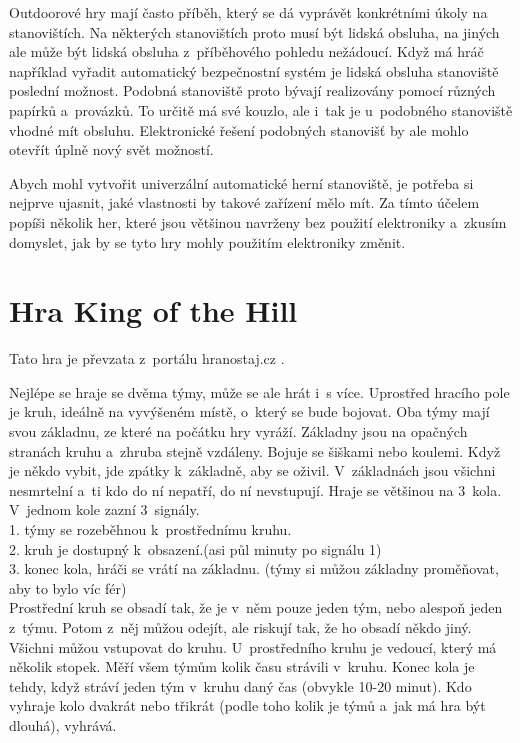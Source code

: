 Outdoorové hry mají často příběh, který se dá vyprávět konkrétními úkoly na stanovištích.
Na některých stanovištích proto musí být lidská obsluha, na jiných ale může být lidská obsluha z~příběhového pohledu nežádoucí.
Když má hráč například vyřadit automatický bezpečnostní systém je lidská obsluha stanoviště poslední možnost.
Podobná stanoviště proto bývají realizovány pomocí různých papírků a~provázků.
To určitě má své kouzlo, ale i~tak je u~podobného stanoviště vhodné mít obsluhu.
Elektronické řešení podobných stanovišť by ale mohlo otevřít úplně nový svět možností.

Abych mohl vytvořit univerzální automatické herní stanoviště, je potřeba si nejprve ujasnit, jaké vlastnosti by takové zařízení mělo mít.
Za tímto účelem popíši několik her, které jsou většinou navrženy bez použití elektroniky a~zkusím domyslet, jak by se tyto hry mohly použitím elektroniky změnit.

\section{Hra King of the Hill \label{KOTH} }
Tato hra je převzata z~portálu hranostaj.cz \cite{KingOfTheHill}.

Nejlépe se hraje se dvěma týmy, může se ale hrát i~s více. 
Uprostřed hracího pole je kruh, ideálně na vyvýšeném místě, o~který se bude bojovat. 
Oba týmy mají svou základnu, ze které na počátku hry vyráží.
Základny jsou na opačných stranách kruhu a~zhruba stejně vzdáleny.
Bojuje se šiškami nebo koulemi. 
Když je někdo vybit, jde zpátky k~základně, aby se oživil. 
V~základnách jsou všichni nesmrtelní a~ti kdo do ní nepatří, do ní nevstupují.
Hraje se většinou na 3~kola. 
V~jednom kole zazní 3~signály.\\
1. týmy se rozeběhnou k~prostřednímu kruhu.\\
2. kruh je dostupný k~obsazení.(asi půl minuty po signálu 1)\\
3. konec kola, hráči se vrátí na základnu. (týmy si můžou základny proměňovat, aby to bylo víc fér)\\
Prostřední kruh se obsadí tak, že je v~něm pouze jeden tým, nebo alespoň jeden z~týmu. 
Potom z~něj můžou odejít, ale riskují tak, že ho obsadí někdo jiný. 
Všichni můžou vstupovat do kruhu.
U~prostředního kruhu je vedoucí, který má několik stopek. 
Měří všem týmům kolik času strávili v~kruhu. 
Konec kola je tehdy, když stráví jeden tým v~kruhu daný čas (obvykle 10-20 minut). 
Kdo vyhraje kolo dvakrát nebo třikrát (podle toho kolik je týmů a~jak má hra být dlouhá), vyhrává.

